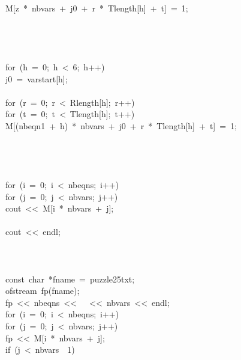 \begin{tabbing}
\>\>\>\>\>M[z\ *\ nbvars\ +\ j0\ +\ r\ *\ Tlength[h]\ +\ t]\ =\ 1;\\[0pt]
\>\>\>\>\>\\[0pt]
\>\>\>\>\\[0pt]
\>\>\>\\[0pt]
\>\>\\[0pt]
\>for\ (h\ =\ 0;\ h\ <\ 6;\ h++)\ \\[0pt]
\>\>j0\ =\ varstart[h];\\[0pt]
\\[0pt]
\>\>for\ (r\ =\ 0;\ r\ <\ Rlength[h];\ r++)\ \\[0pt]
\>\>\>for\ (t\ =\ 0;\ t\ <\ Tlength[h];\ t++)\ \\[0pt]
\>\>\>\>M[(nbeqn1\ +\ h)\ *\ nbvars\ +\ j0\ +\ r\ *\ Tlength[h]\ +\ t]\ =\ 1;\\[0pt]
\>\>\>\>\\[0pt]
\>\>\>\\[0pt]
\>\>\\[0pt]
\\[0pt]
\>for\ (i\ =\ 0;\ i\ <\ nbeqns;\ i++)\ \\[0pt]
\>\>for\ (j\ =\ 0;\ j\ <\ nbvars;\ j++)\ \\[0pt]
\>\>\>cout\ <<\ M[i\ *\ nbvars\ +\ j];\\[0pt]
\>\>\>\\[0pt]
\>\>cout\ <<\ endl;\\[0pt]
\>\>\\[0pt]
\\[0pt]
\>\\[0pt]
\>const\ char\ *fname\ =\ puzzle25txt;\\[0pt]
\>ofstream\ fp(fname);\\[0pt]
\>fp\ <<\ nbeqns\ <<\ \ \ <<\ nbvars\ <<\ endl;\\[0pt]
\>for\ (i\ =\ 0;\ i\ <\ nbeqns;\ i++)\ \\[0pt]
\>\>for\ (j\ =\ 0;\ j\ <\ nbvars;\ j++)\ \\[0pt]
\>\>\>fp\ <<\ M[i\ *\ nbvars\ +\ j];\\[0pt]
\>\>\>if\ (j\ <\ nbvars\ \ 1)\ \\[0pt]

\end{tabbing}
